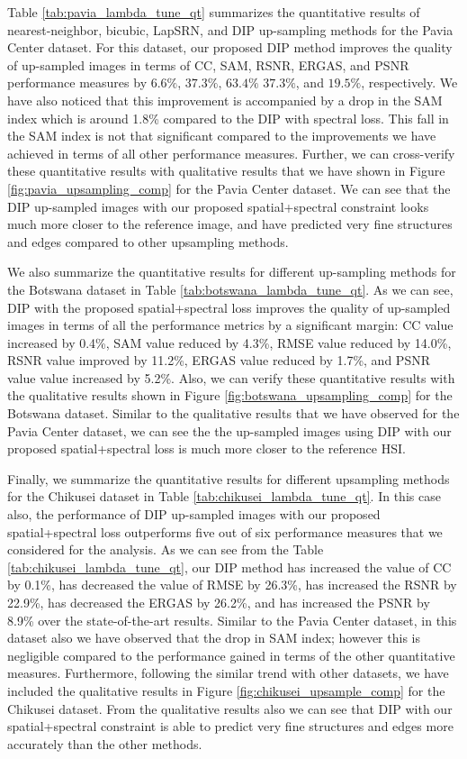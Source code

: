 \documentclass[journal]{IEEEtran}
\begin{document}
    Table \ref{tab:pavia_lambda_tune_qt} summarizes the quantitative results of nearest-neighbor, bicubic, LapSRN, and DIP up-sampling methods for the Pavia Center dataset. For this dataset, our proposed DIP method improves the quality of up-sampled images in terms of CC, SAM, RSNR, ERGAS, and PSNR performance measures by $6.6\%$, $37.3\%$, $63.4\%$ $37.3\%$, and $19.5\%$, respectively. We have also noticed that this improvement is accompanied by a drop in the SAM index which is around 1.8\% compared to the DIP with spectral loss. This fall in the SAM index is not that significant compared to the improvements we have achieved in terms of all other performance measures. Further, we can cross-verify these quantitative results with qualitative results that we have shown in Figure \ref{fig:pavia_upsampling_comp} for the Pavia Center dataset. We can see that the DIP up-sampled images with our proposed spatial+spectral constraint looks much more closer to the reference image, and have predicted very fine structures and edges compared to other upsampling methods. 
    
    We also summarize the quantitative results for different up-sampling methods for the Botswana dataset in Table \ref{tab:botswana_lambda_tune_qt}. As we can see, DIP with the proposed spatial+spectral loss improves the quality of up-sampled images in terms of all the performance metrics by a significant margin: CC value increased by 0.4\%, SAM value reduced by 4.3\%, RMSE value reduced by 14.0\%, RSNR value improved by 11.2\%, ERGAS value reduced by 1.7\%, and PSNR value value increased by 5.2\%. Also, we can verify these quantitative results with the qualitative results shown in Figure \ref{fig:botswana_upsampling_comp} for the Botswana dataset. Similar to the qualitative results that we have observed for the Pavia Center dataset, we can see the the up-sampled images using DIP with our proposed spatial+spectral loss is much more closer to the reference HSI. 
    
    Finally, we summarize the quantitative results for different upsampling methods for the Chikusei dataset in Table \ref{tab:chikusei_lambda_tune_qt}. In this case also, the performance of DIP up-sampled images with our proposed spatial+spectral loss outperforms five out of six performance measures that we considered for the analysis. As we can see from the Table  \ref{tab:chikusei_lambda_tune_qt}, our DIP method has increased the value of CC by 0.1\%, has decreased the value of RMSE by 26.3\%, has increased the RSNR by 22.9\%, has decreased the ERGAS by 26.2\%, and has increased the PSNR by 8.9\% over the state-of-the-art results. Similar to the Pavia Center dataset, in this dataset also we have observed that the drop in SAM index; however this is negligible compared to the performance gained in terms of the other quantitative measures. Furthermore, following the similar trend with other datasets, we have included the qualitative results in Figure \ref{fig:chikusei_upsample_comp} for the Chikusei dataset. From the qualitative results also we can see that  DIP with our spatial+spectral constraint is able to predict very fine structures and edges more accurately than the other methods. 
    
\end{document}
